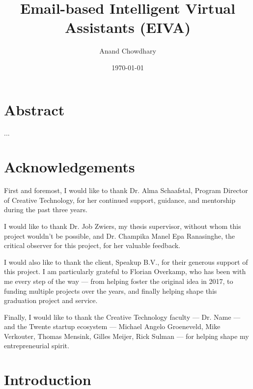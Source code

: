 \documentclass{article}
\title{Email-based Intelligent Virtual Assistants (EIVA)}
\author{Anand Chowdhary}
\date{\today}
\begin{document}

\maketitle

\newpage


\section*{Abstract}

...

\newpage

\section*{Acknowledgements}

First and foremost, I would like to thank Dr. Alma Schaafstal, Program Director of Creative Technology, for her continued support, guidance, and mentorship during the past three years.

I would like to thank Dr. Job Zwiers, my thesis supervisor, without whom this project wouldn't be possible, and Dr. Champika Manel Epa Ranasinghe, the critical observer for this project, for her valuable feedback.

I would also like to thank the client, Speakup B.V., for their generous support of this project. I am particularly grateful to Florian Overkamp, who has been with me every step of the way --- from helping foster the original idea in 2017, to funding multiple projects over the years, and finally helping shape this graduation project and service.

Finally, I would like to thank the Creative Technology faculty --- Dr. Name --- and the Twente startup ecosystem --- Michael Angelo Groeneveld, Mike Verkouter, Thomas Mensink, Gilles Meijer, Rick Sulman --- for helping shape my entrepreneurial spirit.

\newpage

\tableofcontents

\newpage

\listoffigures

\enspace

\listoftables

\newpage

  

\section{Introduction}
\end{document}
